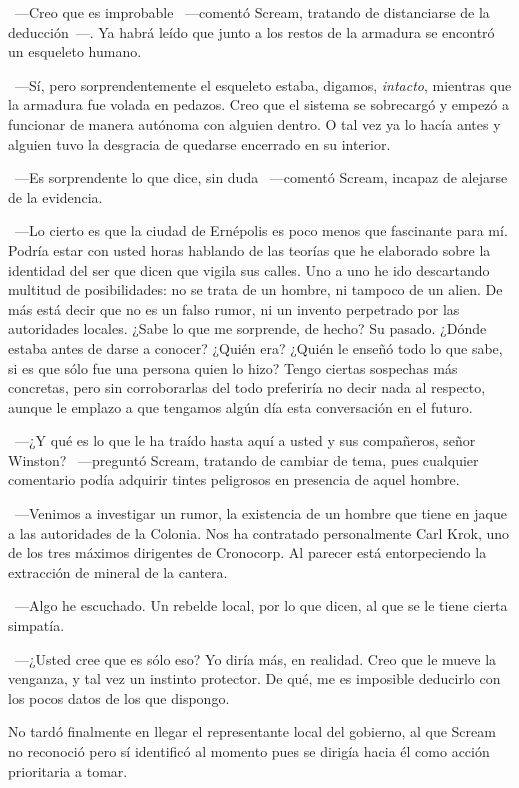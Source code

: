 ~---Creo que es improbable ~---comentó Scream, tratando de distanciarse de la deducción~---. Ya habrá leído que junto a los restos de la armadura se encontró un esqueleto humano.

~---Sí, pero sorprendentemente el esqueleto estaba, digamos, \emph{intacto}, mientras que la armadura fue volada en pedazos. Creo que el sistema se sobrecargó y empezó a funcionar de manera autónoma con alguien dentro. O tal vez ya lo hacía antes y alguien tuvo la desgracia de quedarse encerrado en su interior.

~---Es sorprendente lo que dice, sin duda ~---comentó Scream, incapaz de alejarse de la evidencia.

~---Lo cierto es que la ciudad de Ernépolis es poco menos que fascinante para mí. Podría estar con usted horas hablando de las teorías que he elaborado sobre la identidad del ser que dicen que vigila sus calles. Uno a uno he ido descartando multitud de posibilidades: no se trata de un hombre, ni tampoco de un alien. De más está decir que no es un falso rumor, ni un invento perpetrado por las autoridades locales. ¿Sabe lo que me sorprende, de hecho? Su pasado. ¿Dónde estaba antes de darse a conocer? ¿Quién era? ¿Quién le enseñó todo lo que sabe, si es que sólo fue una persona quien lo hizo? Tengo ciertas sospechas más concretas, pero sin corroborarlas del todo preferiría no decir nada al respecto, aunque le emplazo a que tengamos algún día esta conversación en el futuro.

~---¿Y qué es lo que le ha traído hasta aquí a usted y sus compañeros, señor Winston? ~---preguntó Scream, tratando de cambiar de tema, pues cualquier comentario podía adquirir tintes peligrosos en presencia de aquel hombre.

~---Venimos a investigar un rumor, la existencia de un hombre que tiene en jaque a las autoridades de la Colonia. Nos ha contratado personalmente Carl Krok, uno de los tres máximos dirigentes de Cronocorp. Al parecer está entorpeciendo la extracción de mineral de la cantera.

~---Algo he escuchado. Un rebelde local, por lo que dicen, al que se le tiene cierta simpatía.

~---¿Usted cree que es sólo eso? Yo diría más, en realidad. Creo que le mueve la venganza, y tal vez un instinto protector. De qué, me es imposible deducirlo con los pocos datos de los que dispongo.

No tardó finalmente en llegar el representante local del gobierno, al que Scream no reconoció pero sí identificó al momento pues se dirigía hacia él como acción prioritaria a tomar.

